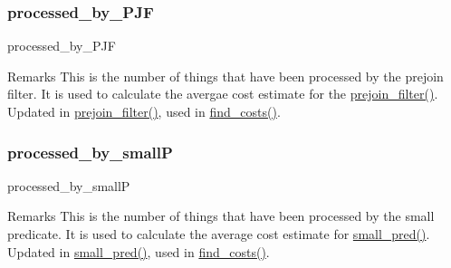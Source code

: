 \subsubsection{\texorpdfstring{processed\+\_\+by\+\_\+\+P\+JF}{processed\_by\_PJF}}
{\footnotesize\ttfamily processed\+\_\+by\+\_\+\+P\+JF}

\begin{DoxyRemark}{Remarks}
This is the number of things that have been processed by the prejoin filter. It is used to calculate the avergae cost estimate for the \hyperlink{classdynamicfilterapp_1_1models_1_1_join_ad1f0a62df23661b1591a26c02bd59664}{prejoin\+\_\+filter()}. Updated in \hyperlink{classdynamicfilterapp_1_1models_1_1_join_ad1f0a62df23661b1591a26c02bd59664}{prejoin\+\_\+filter()}, used in \hyperlink{classdynamicfilterapp_1_1models_1_1_join_ac9cef0d40608117205ed9d5118f5f87c}{find\+\_\+costs()}. 
\end{DoxyRemark}
\mbox{\label{classdynamicfilterapp_1_1models_1_1_join_a74508ba76af18471c51aa3c69fec9c03}} 
\subsubsection{\texorpdfstring{processed\+\_\+by\+\_\+smallP}{processed\_by\_smallP}}
{\footnotesize\ttfamily processed\+\_\+by\+\_\+smallP}

\begin{DoxyRemark}{Remarks}
This is the number of things that have been processed by the small predicate. It is used to calculate the average cost estimate for \hyperlink{classdynamicfilterapp_1_1models_1_1_join_a7f921ca8a9fa8f58520cc49ac743dcac}{small\+\_\+pred()}. Updated in \hyperlink{classdynamicfilterapp_1_1models_1_1_join_a7f921ca8a9fa8f58520cc49ac743dcac}{small\+\_\+pred()}, used in \hyperlink{classdynamicfilterapp_1_1models_1_1_join_ac9cef0d40608117205ed9d5118f5f87c}{find\+\_\+costs()}. 
\end{DoxyRemark}
\mbox{\label{classdynamicfilterapp_1_1models_1_1_join_a83384c5efb00056d72e62f54090f162c}} 
